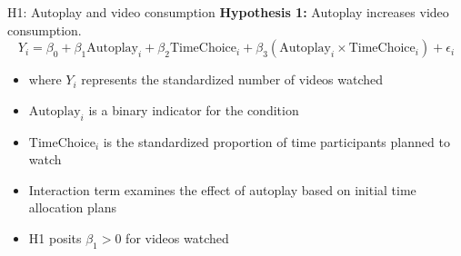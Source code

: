 \documentclass[aspectratio=169,xcolor=dvipsnames]{beamer}
\begin{document}
\begin{frame}{H1: Autoplay and video consumption}
  \textbf{Hypothesis 1:} Autoplay increases video consumption.
  \begin{equation}\label{eq1}
    Y_{i} = \beta_0 + \beta_1 \text{Autoplay}_{i} + \beta_2 \text{TimeChoice}_{i} + \beta_3 (\text{Autoplay}_{i} \times \text{TimeChoice}_{i}) + \epsilon_{i}
  \end{equation}
  \begin{itemize}
    \item where $Y_{i}$ represents the standardized number of videos watched
    \item $\text{Autoplay}_{i}$ is a binary indicator for the condition
    \item $\text{TimeChoice}_{i}$ is the standardized proportion of time participants planned to watch
    \item Interaction term examines the effect of autoplay based on initial time allocation plans
    \item H1 posits $\beta_1 > 0$ for videos watched
  \end{itemize}
\end{frame}
\end{document}
